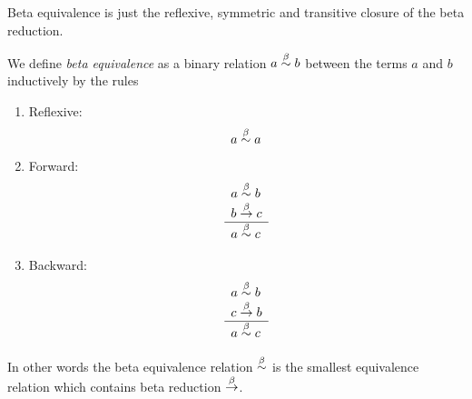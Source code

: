 Beta equivalence is just the reflexive, symmetric and transitive closure of the
beta reduction.

\begin{definition}
    We define \emph{beta equivalence} as a binary relation $a \stackrel{\beta}{\sim} b$ between
    the terms $a$ and $b$ inductively by the rules
    \begin{enumerate}
    \item Reflexive:
        $$ a \stackrel{\beta}{\sim} a$$

    \item Forward:
        $$
        \begin{array}{l} 
            a \stackrel{\beta}{\sim} b
            \\
            b \stackrel{\beta}{\to} c
         \\ \hline 
            a \stackrel{\beta}{\sim} c
        \end{array}
        $$

    \item Backward:
        $$
        \begin{array}{l} 
            a \stackrel{\beta}{\sim} b
            \\
            c \stackrel{\beta}{\to} b
         \\ \hline 
            a \stackrel{\beta}{\sim} c
        \end{array}
        $$
    \end{enumerate}

    In other words the beta equivalence relation $\stackrel{\beta}{\sim}$ is the smallest
    equivalence relation which contains beta reduction $\stackrel{\beta}{\to}$.
\end{definition}


